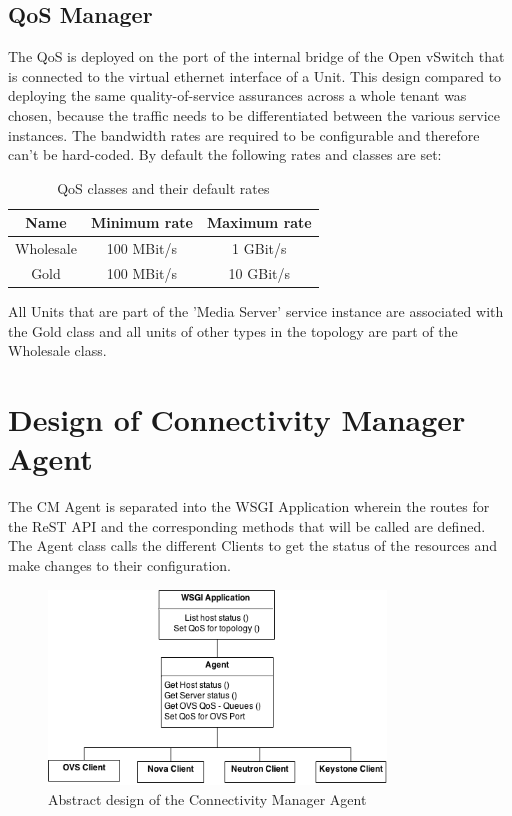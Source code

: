 \subsection{QoS Manager}

The QoS is deployed on the port of the internal bridge of the Open vSwitch that is connected to the virtual ethernet interface of a Unit. This design compared to deploying the same quality-of-service assurances across a whole tenant was chosen, because the traffic needs to be differentiated between the various service instances. The bandwidth rates are required to be configurable and therefore can't be hard-coded. By default the following rates and classes are set:

\begin{table}[H]
\centering

\begin{tabular}{|c|c|c|}
\hline \textbf{Name} & Minimum rate & Maximum rate \\ 
\hline Wholesale & 100 MBit/s & 1 GBit/s \\ 
\hline Gold & 100 MBit/s & 10 GBit/s \\ 
\hline 
\end{tabular} 

\caption{QoS classes and their default rates}
\end{table}


All Units that are part of the 'Media Server' service instance are associated with the Gold class and all units of other types in the topology are part of the Wholesale class.


\newpage
\section{Design of Connectivity Manager Agent}

The CM Agent is separated into the WSGI Application wherein the routes for the ReST API and the corresponding methods that will be called are defined. The Agent class calls the different Clients to get the status of the resources and make changes to their configuration.

\begin{figure}[H]
\centering

\includegraphics[width=0.8\textwidth]{images/design/cm_agent_design_class_diagram.png}

\caption{Abstract design of the Connectivity Manager Agent}
\end{figure}


